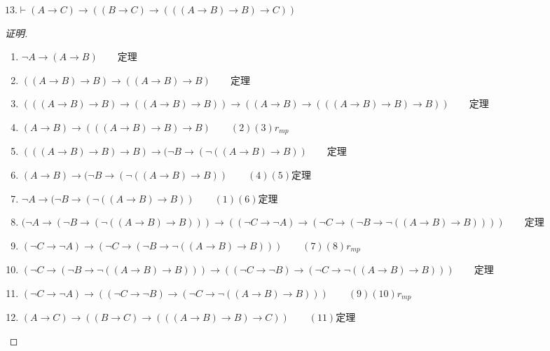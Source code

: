 \documentclass{article}
\begin{document}
\begin{CJK*}{UTF8}{gbsn}









$13.\vdash (A\to C)\to ((B\to C)\to (((A\to B)\to B)\to C))$

\begin{proof}[证明]
$\quad$

  \begin{enumerate}
    \item $\lnot A\to (A\to B)\qquad$定理
    \item $((A\to B)\to B)\to ((A\to B)\to B)\qquad$定理
    \item $(((A\to B)\to B)\to ((A\to B)\to B))\to ((A\to B)\to (((A\to B)\to B)\to B))\qquad$定理
    \item $(A\to B)\to (((A\to B)\to B)\to B)\qquad(2)(3)r_{mp}$
    \item $(((A\to B)\to B)\to B)\to (\lnot B\to (\lnot ((A\to B)\to B))\qquad$定理
    \item $(A\to B)\to (\lnot B\to (\lnot ((A\to B)\to B))\qquad(4)(5)$定理
    \item $\lnot A\to (\lnot B\to (\lnot ((A\to B)\to B))\qquad(1)(6)$定理
    \item $(\lnot A\to (\lnot B\to (\lnot ((A\to B)\to B)))\to ((\lnot C\to \lnot A)\to (\lnot C\to (\lnot B \to \lnot ((A\to B)\to B))))\qquad$定理
    \item $(\lnot C\to \lnot A)\to (\lnot C\to (\lnot B \to \lnot ((A\to B)\to B)))\qquad(7)(8)r_{mp}$
    \item $(\lnot C\to (\lnot B \to \lnot ((A\to B)\to B)))\to ((\lnot C\to \lnot B)\to (\lnot C\to\lnot ((A\to B)\to B)))\qquad$定理
    \item $(\lnot C\to \lnot A)\to ((\lnot C\to \lnot B)\to (\lnot C\to\lnot ((A\to B)\to B)))\qquad (9)(10)r_{mp}$
    \item $(A\to C)\to ((B\to C)\to (((A\to B)\to B)\to C))\qquad (11)$定理
  \end{enumerate}
\end{proof}


\end{CJK*}
\end{document}

